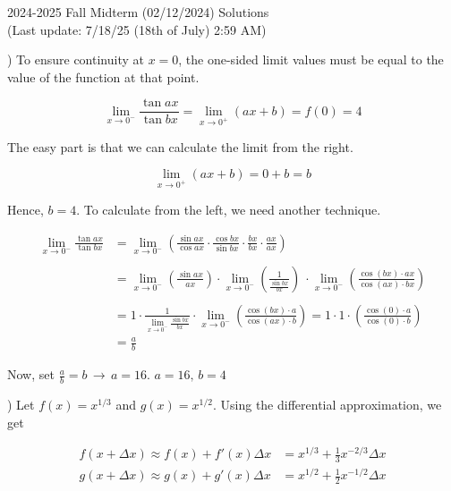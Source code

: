 \documentclass{article}
\begin{document}
\newpage

\begin{center}
2024-2025 Fall Midterm (02/12/2024) Solutions\\
(Last update: 7/18/25 (18th of July) 2:59 AM)
\end{center}

) To ensure continuity at $x=0$, the one-sided limit values must be equal to the value of the function at that point.

\begin{equation*}
\lim_{x\to0^-} \frac{\tan ax}{\tan bx} = \lim_{x\to0^+} (ax+b) = f(0) = 4
\end{equation*}

\hfill

\noindent The easy part is that we can calculate the limit from the right.

\begin{equation*}
\lim_{x\to0^+} (ax+b) = 0+b = b
\end{equation*}

\hfill

\noindent Hence, $b=4$. To calculate from the left, we need another technique.

\begin{align*}
\lim_{x\to0^-} \frac{\tan ax}{\tan bx} &= \lim_{x\to0^-} \left(\frac{\sin ax}{\cos ax} \cdot \frac{\cos bx}{\sin bx} \cdot \frac{bx}{bx}\cdot \frac{ax}{ax}\right)\\\\&=\lim_{x\to0^-} \left(\frac{\sin ax}{ax} \right)\cdot \lim_{x\to0^-} \left(\frac1{ \frac{\sin bx}{bx}}\right)\ \cdot \lim_{x\to0^-} \left(\frac{\cos (bx) \cdot ax}{\cos(ax) \cdot bx}\right)\\\\&=1\cdot  \frac1{\displaystyle \lim_{x\to0^-} \frac{\sin bx}{bx} }\cdot \lim_{x\to0^-} \left(\frac{\cos (bx) \cdot a}{\cos(ax) \cdot b}\right)= 1\cdot 1\cdot\left(\frac{\cos(0) \cdot a}{\cos(0) \cdot b}\right)\\&=\frac ab
\end{align*}

\hfill

\noindent Now, set $\displaystyle \frac ab = b\,\rightarrow\, a= 16$. $\boxed{a=16,\,b=4}$

\hfill

) Let $f(x) = x^{1/3}$ and $g(x) = x^{1/2}$. Using the differential approximation, we get

\begin{align*}
f(x+\Delta x)\approx f(x) + f'(x)\Delta x&=x^{1/3}+\frac13x^{-2/3}\Delta x\\
g(x+\Delta x)\approx g(x) + g'(x)\Delta x&=x^{1/2}+\frac12x^{-1/2}\Delta x
\end{align*}
\end{document}
